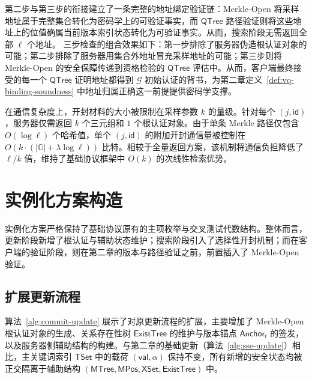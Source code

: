 第二步与第三步的衔接建立了一条完整的地址绑定验证链：Merkle-Open 将采样地址属于完整集合转化为密码学上的可验证事实，而 $\mathsf{QTree}$ 路径验证则将这些地址上的位值确属当前版本索引状态转化为可验证事实。从而，搜索阶段无需返回全部 $\ell$ 个地址。
三步检查的组合效果如下：第一步排除了服务器伪造根认证对象的可能；第二步排除了服务器用集合外地址冒充采样地址的可能；第三步则将 Merkle-Open 的安全保障传递到资格检验的 $\mathsf{QTree}$ 评估中。从而，客户端最终接受的每一个 $\mathsf{QTree}$ 证明地址都得到 $\mathcal{G}$ 初始认证的背书，为第二章定义~\ref{def:vq-binding-soundness} 中地址归属正确这一前提提供密码学支撑。

在通信复杂度上，开封材料的大小被限制在采样参数 $k$ 的量级。针对每个 $(j,\mathsf{id})$，服务器仅需返回 $k$ 个三元组和 $1$ 个根认证对象。由于单条 Merkle 路径仅包含 $O(\log\ell)$ 个哈希值，单个 $(j,\mathsf{id})$ 的附加开封通信量被控制在 $O(k\cdot(|\mathbb{G}|+\lambda\log\ell))$ 比特。相较于全量返回方案，该机制将通信负担降低了 $\ell/k$ 倍，维持了基础协议框架中 $O(k)$ 的次线性检索优势。

\section{实例化方案构造}\label{sec:commit-protocol}

实例化方案严格保持了基础协议原有的主项枚举与交叉测试代数结构。整体而言，更新阶段新增了根认证与辅助状态维护；搜索阶段引入了选择性开封机制；而在客户端的验证阶段，则在第二章的版本与路径验证之前，前置插入了 Merkle-Open 验证。

\subsection{扩展更新流程}
算法~\ref{alg:commit-update} 展示了对原更新流程的扩展，主要增加了 Merkle-Open 根认证对象的生成、关系存在性树 $\mathsf{ExistTree}$ 的维护与版本锚点 $\mathsf{Anchor}_t$ 的签发，以及服务器侧辅助结构的构建。与第二章的基础更新（算法~\ref{alg:sse-update}）相比，主关键词索引 $\mathsf{TSet}$ 中的载荷 $(\mathsf{val},\alpha)$ 保持不变，所有新增的安全状态均被正交隔离于辅助结构 $(\mathsf{MTree},\mathsf{MPos},\mathsf{XSet},\mathsf{ExistTree})$ 中。

